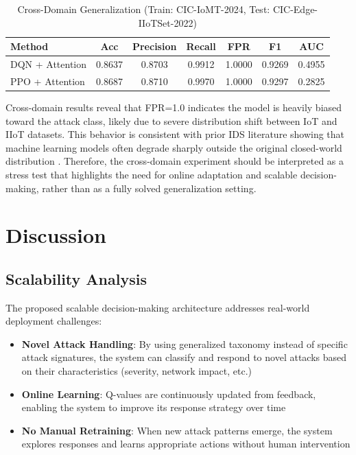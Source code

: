 \documentclass[conference]{IEEEtran}
\begin{document}
\begin{table}[htbp]
\centering
\caption{Cross-Domain Generalization (Train: CIC-IoMT-2024, Test: CIC-Edge-IIoTSet-2022)}
\begin{tabular}{lcccccc}
\toprule
\textbf{Method} & \textbf{Acc} & \textbf{Precision} & \textbf{Recall} & \textbf{FPR} & \textbf{F1} & \textbf{AUC} \\
\midrule
DQN + Attention & 0.8637 & 0.8703 & 0.9912 & 1.0000 & 0.9269 & 0.4955 \\
PPO + Attention & 0.8687 & 0.8710 & 0.9970 & 1.0000 & 0.9297 & 0.2825 \\
\bottomrule
\end{tabular}
\end{table}

Cross-domain results reveal that FPR=1.0 indicates the model is heavily biased toward the attack class, likely due to severe distribution shift between IoT and IIoT datasets. This behavior is consistent with prior IDS literature showing that machine learning models often degrade sharply outside the original closed-world distribution \cite{sommer}. Therefore, the cross-domain experiment should be interpreted as a stress test that highlights the need for online adaptation and scalable decision-making, rather than as a fully solved generalization setting.

\section{Discussion}

\subsection{Scalability Analysis}

The proposed scalable decision-making architecture addresses real-world deployment challenges:

\begin{itemize}
    \item \textbf{Novel Attack Handling}: By using generalized taxonomy instead of specific attack signatures, the system can classify and respond to novel attacks based on their characteristics (severity, network impact, etc.)
    \item \textbf{Online Learning}: Q-values are continuously updated from feedback, enabling the system to improve its response strategy over time
    \item \textbf{No Manual Retraining}: When new attack patterns emerge, the system explores responses and learns appropriate actions without human intervention
\end{itemize}
\end{document}
